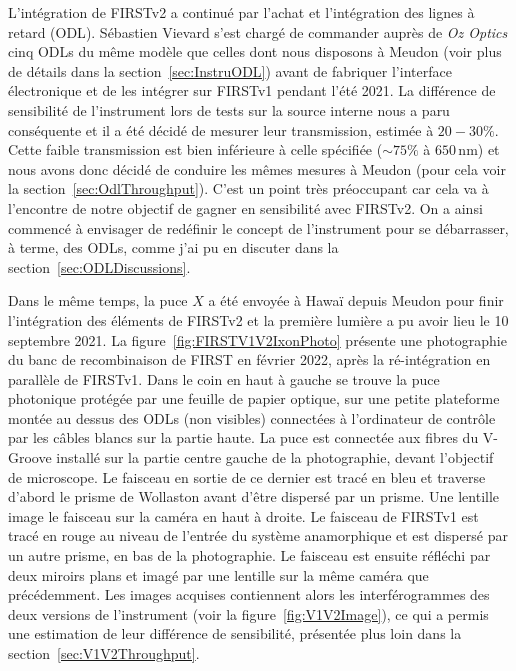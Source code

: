 L'intégration de \ac{FIRSTv2} a continué par l'achat et l'intégration des lignes à retard (\acrfull{ODL}). Sébastien Vievard s'est chargé de commander auprès de \textit{Oz Optics} cinq \ac{ODL}s du même modèle que celles dont nous disposons à Meudon (voir plus de détails dans la section~\ref{sec:InstruODL}) avant de fabriquer l'interface électronique et de les intégrer sur \ac{FIRSTv1} pendant l'été 2021. La différence de sensibilité de l'instrument lors de tests sur la source interne nous a paru conséquente et il a été décidé de mesurer leur transmission, estimée à $20 - 30 \%$. Cette faible transmission est bien inférieure à celle spécifiée ($\sim 75 \%$ à $650 \,$nm) et nous avons donc décidé de conduire les mêmes mesures à Meudon (pour cela voir la section~\ref{sec:OdlThroughput}). C'est un point très préoccupant car cela va à l'encontre de notre objectif de gagner en sensibilité avec \ac{FIRSTv2}. On a ainsi commencé à envisager de redéfinir le concept de l'instrument pour se débarrasser, à terme, des \ac{ODL}s, comme j'ai pu en discuter dans la section~\ref{sec:ODLDiscussions}.

Dans le même temps, la puce $X$ a été envoyée à Hawaï depuis Meudon pour finir l'intégration des éléments de \ac{FIRSTv2} et la première lumière a pu avoir lieu le 10 septembre 2021. La figure~\ref{fig:FIRSTV1V2IxonPhoto} présente une photographie du banc de recombinaison de \ac{FIRST} en février 2022, après la ré-intégration en parallèle de \ac{FIRSTv1}. Dans le coin en haut à gauche se trouve la puce photonique protégée par une feuille de papier optique, sur une petite plateforme montée au dessus des \ac{ODL}s (non visibles) connectées à l'ordinateur de contrôle par les câbles blancs sur la partie haute. La puce est connectée aux fibres du V-Groove installé sur la partie centre gauche de la photographie, devant l'objectif de microscope. Le faisceau en sortie de ce dernier est tracé en bleu et traverse d'abord le prisme de Wollaston avant d'être dispersé par un prisme. Une lentille image le faisceau sur la caméra en haut à droite. Le faisceau de \ac{FIRSTv1} est tracé en rouge au niveau de l'entrée du système anamorphique et est dispersé par un autre prisme, en bas de la photographie. Le faisceau est ensuite réfléchi par deux miroirs plans et imagé par une lentille sur la même caméra que précédemment. Les images acquises contiennent alors les interférogrammes des deux versions de l'instrument (voir la figure~\ref{fig:V1V2Image}), ce qui a permis une estimation de leur différence de sensibilité, présentée plus loin dans la section~\ref{sec:V1V2Throughput}.

